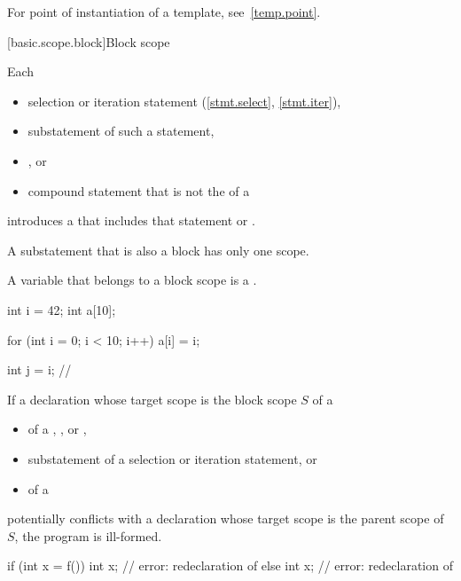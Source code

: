 \pnum
\begin{note}
For point of instantiation of a template, see~\ref{temp.point}.
\end{note}

[basic.scope.block]{Block scope}

%

\pnum
Each
\begin{itemize}
\item
selection or iteration statement (\ref{stmt.select}, \ref{stmt.iter}),
\item
substatement of such a statement,
\item
{}%
, or
\item
compound statement
that is not the  of a 
\end{itemize}
introduces a 
that includes that statement or .
\begin{note}
A substatement that is also a block has only one scope.
\end{note}
A variable that belongs to a block scope is a .
\begin{example}
\begin{codeblock}
int i = 42;
int a[10];

for (int i = 0; i < 10; i++)
  a[i] = i;

int j = i;          // 
\end{codeblock}
\end{example}

\pnum
If a declaration whose target scope is the block scope $S$ of a
\begin{itemize}
\item
{} of a ,
, or ,
\item
substatement of a selection or iteration statement, or
\item
{} of a 
\end{itemize}
potentially conflicts with a declaration
whose target scope is the parent scope of $S$,
the program is ill-formed.
\begin{example}
\begin{codeblock}
if (int x = f()) {
  int x;            // error: redeclaration of 
}
else {
  int x;            // error: redeclaration of 
}
\end{codeblock}
\end{example}

